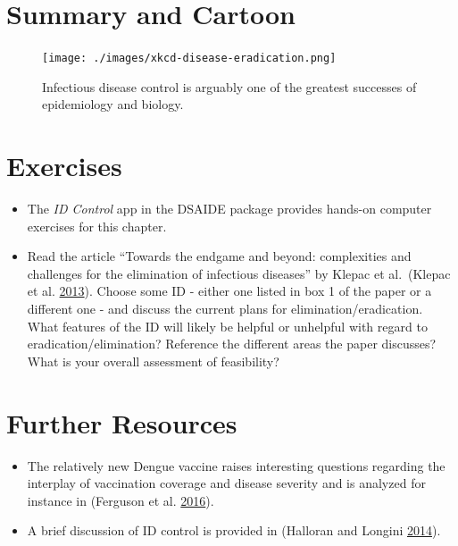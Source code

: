 \documentclass[
]{book}
\providecommand{\tightlist}{%
  \setlength{\itemsep}{0pt}\setlength{\parskip}{0pt}}
\begin{document}
\hypertarget{summary-and-cartoon-8}{%
\section{Summary and Cartoon}\label{summary-and-cartoon-8}}

\begin{figure}
\centering
\texttt{[image: ./images/xkcd-disease-eradication.png]}
\caption{Infectious disease control is arguably one of the greatest successes of epidemiology and biology.}
\end{figure}

\hypertarget{exercises-8}{%
\section{Exercises}\label{exercises-8}}

\begin{itemize}
\tightlist
\item
  The \emph{ID Control} app in the DSAIDE package provides hands-on computer exercises for this chapter.
\item
  Read the article ``Towards the endgame and beyond: complexities and challenges for the elimination of infectious diseases'' by Klepac et al.~(Klepac et al. \protect\hyperlink{ref-klepac13}{2013}). Choose some ID - either one listed in box 1 of the paper or a different one - and discuss the current plans for elimination/eradication. What features of the ID will likely be helpful or unhelpful with regard to eradication/elimination? Reference the different areas the paper discusses? What is your overall assessment of feasibility?
\end{itemize}

\hypertarget{further-resources-8}{%
\section{Further Resources}\label{further-resources-8}}

\begin{itemize}
\tightlist
\item
  The relatively new Dengue vaccine raises interesting questions regarding the interplay of vaccination coverage and disease severity and is analyzed for instance in (Ferguson et al. \protect\hyperlink{ref-ferguson16}{2016}).
\item
  A brief discussion of ID control is provided in (Halloran and Longini \protect\hyperlink{ref-halloran14}{2014}).
\end{itemize}
\end{document}
